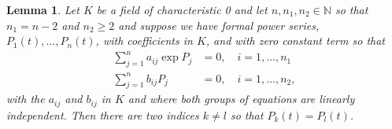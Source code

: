 \documentclass{article}
\newtheorem{lemma}{Lemma}[section]
\newcommand{\mbb}[1]{\mathbb{#1}}
\begin{document}
\begin{lemma} \label{lem: Two power series are equal}
    Let $K$ be a field of characteristic 0 and let $n,n_1,n_2 \in \mbb N$ so that $n_1 = n - 2$ and $n_2 \geq 2$ and suppose we have formal power series, $P_1(t), ..., P_n(t)$, with coefficients in $K$, and with zero constant term so that
    \begin{align*}
        \sum_{j = 1}^n a_{ij} \exp P_j &= 0, \quad i = 1, ..., n_1 \\
        \sum_{j = 1}^n b_{ij} P_j &= 0, \quad i = 1, ..., n_2,
    \end{align*}
    with the $a_{ij}$ and $b_{ij}$ in $K$ and where both groups of equations are linearly independent. Then there are two indices $k \neq l$ so that $P_k(t) = P_l(t)$.
\end{lemma}
\end{document}
